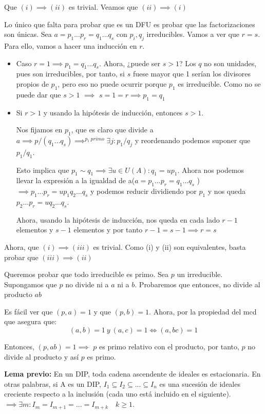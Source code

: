 \documentclass[11pt, a4paper, titlepage]{article}
\makeatletter
\newif\IfInSansMode
\let\oldsf\sffamily
\renewcommand*{\sffamily}{\oldsf\mathversion{sans}\InSansModetrue}
\let\oldnorm\normalfont
\renewcommand*{\normalfont}{\oldnorm\InSansModefalse\mathversion{normal}}
\renewenvironment{proof}[1][\proofname] {\vspace{-15pt}\par\pushQED{\qed}\normalfont\topsep6\p@\@plus6\p@\relax\trivlist\item[\hskip\labelsep\it#1\@addpunct{.}]\ignorespaces}{\popQED\endtrivlist\@endpefalse}
\renewenvironment{proof}[1][\proofname] {\par\pushQED{\qed}\normalfont\topsep6\p@\@plus6\p@\relax\trivlist\item[\hskip\labelsep\itshape\sffamily#1\@addpunct{.}]\ignorespaces}{\popQED\endtrivlist\@endpefalse}
\theoremstyle{theorem-style}
\theoremstyle{definition-style}
\theoremstyle{remark-style}
\theoremstyle{example-style}
\makeatother
\begin{document}
\begin{proof}
	Que $(i)\implies (ii)$ es trivial. Veamos que $(ii) \implies (i)$

	Lo único que falta para probar que es un DFU es probar que las factorizaciones son únicas. Sea $a= p_1...p_r = q_1...q_s$ con $p_i,q_j$ irreducibles. Vamos a ver que $r=s$. Para ello, vamos a hacer una inducción en $r$.

	\begin{itemize}
	\item Caso $r=1 \implies p_1 = q_1...q_s$. Ahora, ¿puede ser $s>1$? Los $q$ no son unidades, pues son irreducibles, por tanto, si $s$ fuese mayor que 1 serían los divisores propios de $p_1$, pero eso no puede ocurrir porque $p_1$ es irreducible. Como no se puede dar que $s>1$ $\implies$ $s=1=r \implies p_1 = q_1$

	\item Si $r> 1$ y usando la hipótesis de inducción, entonces $s > 1$.

	Nos fijamos en $p_1$, que es claro que divide a $a\implies p/(q_1...q_s)\implies^{p_1 \ primo} \exists j : p_1 /q_j$ y reordenando podemos suponer que $p_1/q_1$.

	Esto implica que $p_1 \sim q_1 \implies \exists u \in U(A): q_1 = up_1$. Ahora nos podemos llevar la expresión a la igualdad de a($a= p_1...p_r = q_1...q_s$ ) $\implies p_1...p_r = up_1q_2...q_s $ y podemos reducir dividiendo por $p_1$ y nos queda $p_2...p_r = uq_2...q_s$.

	Ahora, usando la hipótesis de inducción, nos queda en cada lado $r-1$ elementos y $s-1$ elementos y por tanto $r-1 =s-1\implies r=s$
\end{itemize}

Ahora, que $(i) \implies (iii)$ es trivial. Como (i) y (ii) son equivalentes, basta probar que $(iii) \implies (ii)$

Queremos probar que todo irreducible es primo. Sea $p$ un irreducible. Supongamos que $p$ no divide ni a $a$ ni a $b$. Probaremos que entonces, no divide al producto $ab$

Es fácil ver que $(p,a) = 1$ y que $(p,b) = 1$. Ahora, por la propiedad del mcd que asegura que:
\[
(a,b) = 1 \ y \ (a,c) = 1 \iff (a,bc) = 1
\]

Entonces, $(p,ab) = 1 \implies$ $p$ es primo relativo con el producto, por tanto, $p$ no divide al producto y así $p$ es primo.
\end{proof}

	\textbf{Lema previo:} En un DIP, toda cadena ascendente de ideales es estacionaria. En otras palabras, si A es un DIP, $I_1 \subseteq I_2 \subseteq ... \subseteq I_{n}$ es una sucesión de ideales creciente respecto a la inclusión (cada uno está incluido en el siguiente). $\implies \exists m : I_m = I_{m+1} = ... = I_{m+k} \quad k \geq 1$.
\end{document}
